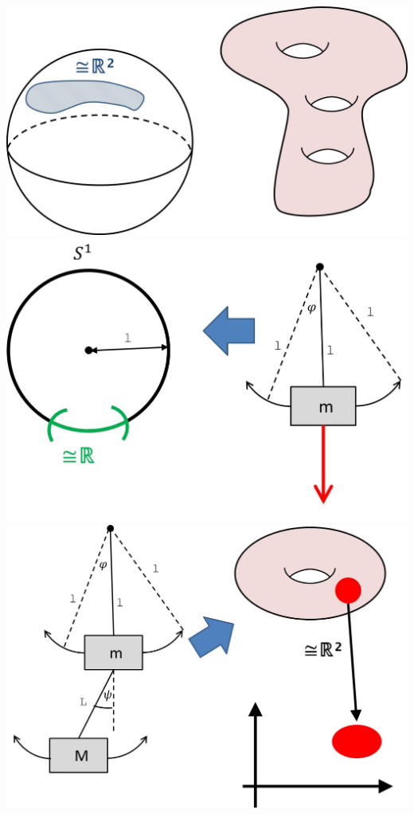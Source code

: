 \documentclass[a4paper,11pt,notitlepage]{report}
\begin{document}
\includegraphics[scale=0.3]{images/Mannigfaltigkeiten1.jpg} \newline \newline
\includegraphics[scale=0.4]{images/S1_Pendel.jpg} \newline \newline
\includegraphics[scale=0.4]{images/Torus_Doppelpendel.jpg} \newline \newline
\end{document}
